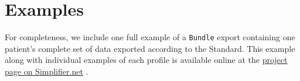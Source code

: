 \documentclass[12px]{report}
\def\code#1{\texttt{#1}} %
\begin{document}
\appendix

\chapter{Examples}
\label{app:ex}

For completeness, we include one full example of a \code{Bundle} export containing one patient's complete set of data exported according to the Standard.
This example along with individual examples of each profile is available online at the \href{https://simplifier.net/treat-nicotine-usage-diga}{project page on Simplifier.net} \cite{project}.


% 
\end{document}
